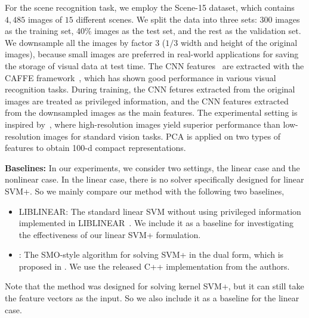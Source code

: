 For the scene recognition task, we employ the Scene-15
dataset\citep{scene-15}, which contains $4,485$ images of $15$
different scenes.  We split the data into three sets: $300$ images as
the training set, 40\% images as the test set, and the rest as the
validation set.  We downsample all the images by factor $3$ ($1/3$
width and height of the original images), because small images are
preferred in real-world applications for saving the storage of visual
data at test time.  The CNN features~\citep{deepnet:nips12} are
extracted with the CAFFE framework~\citep{caffe}, which has shown good
performance in various visual recognition tasks. During training, the
CNN fetures extracted from the original images are treated as
privileged information, and the CNN features extracted from the
downsampled images as the main features. The experimental setting is
inspired by~\citep{SR4VTs:wacv16}, where high-resolution images yield
superior performance than low-resolution images for standard vision
tasks. PCA is applied on two types of features to obtain 100-d
compact representations.

\noindent\textbf{Baselines:}
In our experiments, we consider two settings, the linear case and the
nonlinear case. In the linear case, there is no solver specifically
designed for linear SVM+. So we mainly compare our method with the
following two baselines,
\begin{itemize}
\setlength\itemsep{-2pt}
\item LIBLINEAR: The standard linear SVM without using privileged information implemented in LIBLINEAR~\citep{liblinear}. We include it as a baseline for investigating the effectiveness of our linear SVM+ formulation.
\item \casmo: The SMO-style algorithm for solving SVM+ in the dual form, which is proposed in \citep{Pechyony2010}. We use the released C++ implementation from the authors.
\end{itemize}
Note that the \casmo method was designed for solving kernel SVM+, but
it can still take the feature vectors as the input. So we also include
it as a baseline for the linear case.

